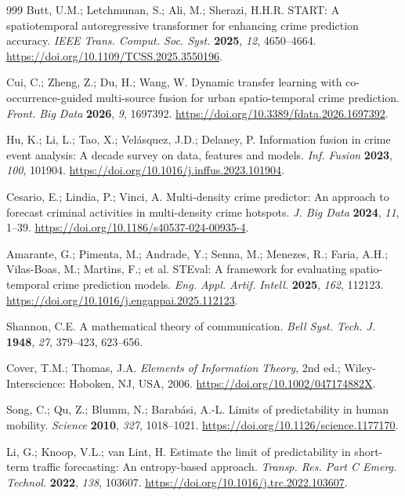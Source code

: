 \begin{thebibliography}{999}
Butt, U.M.; Letchmunan, S.; Ali, M.; Sherazi, H.H.R. START: A spatiotemporal autoregressive transformer for enhancing crime prediction accuracy. \emph{IEEE Trans. Comput. Soc. Syst.} \textbf{2025}, \emph{12}, 4650--4664. \url{https://doi.org/10.1109/TCSS.2025.3550196}.

Cui, C.; Zheng, Z.; Du, H.; Wang, W. Dynamic transfer learning with co-occurrence-guided multi-source fusion for urban spatio-temporal crime prediction. \emph{Front. Big Data} \textbf{2026}, \emph{9}, 1697392. \url{https://doi.org/10.3389/fdata.2026.1697392}.

Hu, K.; Li, L.; Tao, X.; Vel\'asquez, J.D.; Delaney, P. Information fusion in crime event analysis: A decade survey on data, features and models. \emph{Inf. Fusion} \textbf{2023}, \emph{100}, 101904. \url{https://doi.org/10.1016/j.inffus.2023.101904}.

Cesario, E.; Lindia, P.; Vinci, A. Multi-density crime predictor: An approach to forecast criminal activities in multi-density crime hotspots. \emph{J. Big Data} \textbf{2024}, \emph{11}, 1--39. \url{https://doi.org/10.1186/s40537-024-00935-4}.

Amarante, G.; Pimenta, M.; Andrade, Y.; Senna, M.; Menezes, R.; Faria, A.H.; Vilas-Boas, M.; Martins, F.; et al. STEval: A framework for evaluating spatio-temporal crime prediction models. \emph{Eng. Appl. Artif. Intell.} \textbf{2025}, \emph{162}, 112123. \url{https://doi.org/10.1016/j.engappai.2025.112123}.

Shannon, C.E. A mathematical theory of communication. \emph{Bell Syst. Tech. J.} \textbf{1948}, \emph{27}, 379--423, 623--656.

Cover, T.M.; Thomas, J.A. \emph{Elements of Information Theory}, 2nd ed.; Wiley-Interscience: Hoboken, NJ, USA, 2006. \url{https://doi.org/10.1002/047174882X}.

Song, C.; Qu, Z.; Blumm, N.; Barab\'asi, A.-L. Limits of predictability in human mobility. \emph{Science} \textbf{2010}, \emph{327}, 1018--1021. \url{https://doi.org/10.1126/science.1177170}.

Li, G.; Knoop, V.L.; van Lint, H. Estimate the limit of predictability in short-term traffic forecasting: An entropy-based approach. \emph{Transp. Res. Part C Emerg. Technol.} \textbf{2022}, \emph{138}, 103607. \url{https://doi.org/10.1016/j.trc.2022.103607}.


\end{thebibliography}
